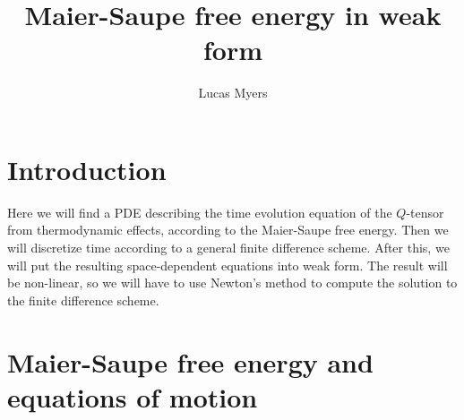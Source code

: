 \documentclass[reqno]{article}
\begin{document}
	\title{Maier-Saupe free energy in weak form}
	\author{Lucas Myers}
	\maketitle
	
	\section{Introduction}
	Here we will find a PDE describing the time evolution equation of the $Q$-tensor from thermodynamic effects, according to the Maier-Saupe free energy.
	Then we will discretize time according to a general finite difference scheme.
	After this, we will put the resulting space-dependent equations into weak form.
	The result will be non-linear, so we will have to use Newton's method to compute the solution to the finite difference scheme.
	
	\section{Maier-Saupe free energy and equations of motion}
\end{document}
